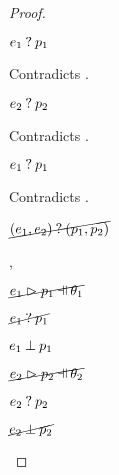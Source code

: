 \begin{proof}
\begin{byCases}
\begin{byCases}
\begin{byCases}
\begin{byCases}
            \item[\text{(\ref{rule:MMPairL})}]
                \begin{pfsteps*}
                \item $e_1 \mathbin{?} p_1$ 
                \end{pfsteps*}
                Contradicts .
            \item[\text{(\ref{rule:MMPairR})}]
                \begin{pfsteps*}
                \item $e_2 \mathbin{?} p_2$ 
                \end{pfsteps*}
                Contradicts .
            \item[\text{(\ref{rule:MMPair})}]
                \begin{pfsteps*}
                \item $e_1 \mathbin{?} p_1$ 
                \end{pfsteps*}
                Contradicts .
            \end{byCases}
            \begin{pfsteps*}
            \item $\cancel{(e_1 , e_2) \mathbin{?} (p_1 , p_2)}$ 
            \end{pfsteps*}
        \item[\hnotmatch{e_1}{p_1},\hmaymatch{e_2}{p_2}]
            \begin{pfsteps*}
            \item $\cancel{\hpatmatch{e_1}{p_1}{\theta_1}}$  
            \item $\cancel{e_1 \mathbin{?} p_1}$  
            \item $e_1 \mathbin{\bot} p_1$  
            \item $\cancel{\hpatmatch{e_2}{p_2}{\theta_2}}$  
            \item $e_2 \mathbin{?} p_2$  
            \item $\cancel{e_2 \mathbin{\bot} p_2}$  

\end{pfsteps*}
\end{byCases}
\end{byCases}
\end{byCases}
\end{proof}
